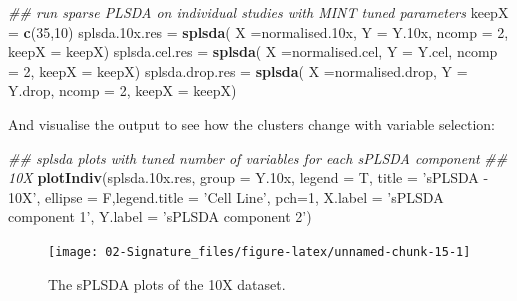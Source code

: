 \documentclass[]{book}
\newenvironment{Shaded}{\begin{snugshade}}{\end{snugshade}}
\newcommand{\CommentTok}[1]{\textcolor[rgb]{0.56,0.35,0.01}{\textit{#1}}}
\newcommand{\DataTypeTok}[1]{\textcolor[rgb]{0.13,0.29,0.53}{#1}}
\newcommand{\DecValTok}[1]{\textcolor[rgb]{0.00,0.00,0.81}{#1}}
\newcommand{\FloatTok}[1]{\textcolor[rgb]{0.00,0.00,0.81}{#1}}
\newcommand{\KeywordTok}[1]{\textcolor[rgb]{0.13,0.29,0.53}{\textbf{#1}}}
\newcommand{\NormalTok}[1]{#1}
\newcommand{\StringTok}[1]{\textcolor[rgb]{0.31,0.60,0.02}{#1}}
\theoremstyle{definition}
\theoremstyle{definition}
\theoremstyle{definition}
\theoremstyle{remark}
\begin{document}
\begin{Shaded}
\begin{Highlighting}[]
\CommentTok{## run sparse PLSDA on individual studies with MINT tuned parameters}
\NormalTok{keepX =}\StringTok{ }\KeywordTok{c}\NormalTok{(}\DecValTok{35}\NormalTok{,}\DecValTok{10}\NormalTok{)}
\NormalTok{splsda}\FloatTok{.10}\NormalTok{x.res =}\StringTok{ }\KeywordTok{splsda}\NormalTok{( }\DataTypeTok{X =}\NormalTok{normalised}\FloatTok{.10}\NormalTok{x, }\DataTypeTok{Y =}\NormalTok{ Y}\FloatTok{.10}\NormalTok{x, }\DataTypeTok{ncomp =} \DecValTok{2}\NormalTok{,  }
                              \DataTypeTok{keepX =}\NormalTok{ keepX)}
\NormalTok{splsda.cel.res =}\StringTok{ }\KeywordTok{splsda}\NormalTok{( }\DataTypeTok{X =}\NormalTok{normalised.cel, }\DataTypeTok{Y =}\NormalTok{ Y.cel, }\DataTypeTok{ncomp =} \DecValTok{2}\NormalTok{,  }
                              \DataTypeTok{keepX =}\NormalTok{ keepX)}
\NormalTok{splsda.drop.res =}\StringTok{ }\KeywordTok{splsda}\NormalTok{( }\DataTypeTok{X =}\NormalTok{normalised.drop, }\DataTypeTok{Y =}\NormalTok{ Y.drop, }\DataTypeTok{ncomp =} \DecValTok{2}\NormalTok{,  }
                              \DataTypeTok{keepX =}\NormalTok{ keepX)}
\end{Highlighting}
\end{Shaded}

And visualise the output to see how the clusters change with variable
selection:

\begin{Shaded}
\begin{Highlighting}[]
\CommentTok{## splsda plots with tuned number of variables for each sPLSDA component}
\CommentTok{## 10X}
\KeywordTok{plotIndiv}\NormalTok{(splsda}\FloatTok{.10}\NormalTok{x.res, }\DataTypeTok{group =}\NormalTok{ Y}\FloatTok{.10}\NormalTok{x,}
          \DataTypeTok{legend  =}\NormalTok{ T, }\DataTypeTok{title     =} \StringTok{'sPLSDA - 10X'}\NormalTok{,}
          \DataTypeTok{ellipse =}\NormalTok{ F,}\DataTypeTok{legend.title =} \StringTok{'Cell Line'}\NormalTok{,}
          \DataTypeTok{pch=}\DecValTok{1}\NormalTok{,}
          \DataTypeTok{X.label =} \StringTok{'sPLSDA component 1'}\NormalTok{,}
          \DataTypeTok{Y.label =} \StringTok{'sPLSDA component 2'}\NormalTok{)}
\end{Highlighting}
\end{Shaded}

\begin{figure}[ht]

{\centering \texttt{[image: 02-Signature\_files/figure-latex/unnamed-chunk-15-1]} 

}

\caption{ The sPLSDA plots of the 10X dataset.}\label{fig:unnamed-chunk-15}
\end{figure}
\end{document}

